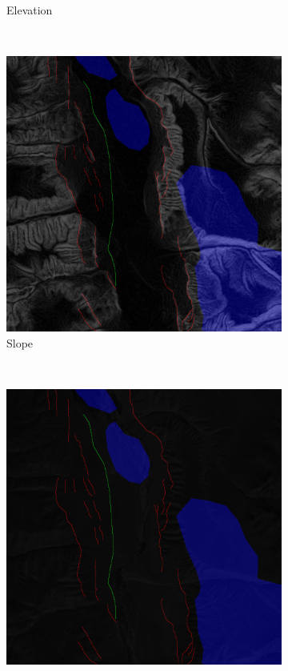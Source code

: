 \documentclass[11pt,a4paper]{article}
\begin{document}
\begin{figure}[t]
\begin{subfigure}[b]{0.18\textwidth}
        \caption{Elevation}
        \label{fig:features_elevation}
    \end{subfigure}
    ~
    \begin{subfigure}[b]{0.18\textwidth}
        \includegraphics[width=\textwidth]{graphics/data/0/features_slope.png}
        \caption{Slope}
        \label{fig:features_slope}
    \end{subfigure}
    ~
    \begin{subfigure}[b]{0.18\textwidth}
        \includegraphics[width=\textwidth]{graphics/data/0/features_ultrablue.png}

\end{subfigure}
\end{figure}
\end{document}
